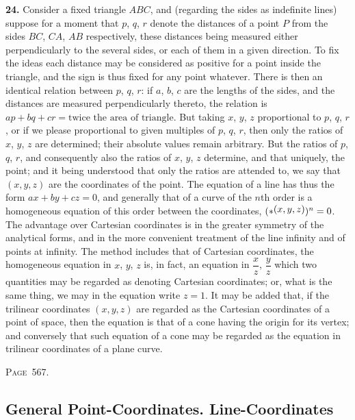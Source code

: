 \documentclass[11pt,a4paper]{article}
\theoremstyle{definition}
\begin{document}
\textbf{24.} Consider a fixed triangle $ABC$, and (regarding the sides as indefinite lines) suppose for a moment that $p$, $q$, $r$ denote the distances of a point $P$ from the sides $BC$, $CA$, $AB$ respectively, these distances being measured either perpendicularly to the several sides, or each of them in a given direction. To fix the ideas each distance may be considered as positive for a point inside the triangle, and the sign is thus fixed for any point whatever. There is then an identical relation between $p$, $q$, $r$: if $a$, $b$, $c$ are the lengths of the sides, and the distances are measured perpendicularly thereto, the relation is $ap+bq+cr=\text{twice the area of triangle}$. But taking $x$, $y$, $z$ proportional to $p$, $q$, $r$, or if we please proportional to given multiples of $p$, $q$, $r$, then only the ratios of $x$, $y$, $z$ are determined; their absolute values remain arbitrary. But the ratios of $p$, $q$, $r$, and consequently also the ratios of $x$, $y$, $z$ determine, and that uniquely, the point; and it being understood that only the ratios are attended to, we say that $(x,y,z)$ are the coordinates of the point. The equation of a line has thus the form $ax+by+cz=0$, and generally that of a curve of the $n$th order is a homogeneous equation of this order between the coordinates, $(*\,\raisebox{0.5ex}{\text{$\!(x,y,z)$}})^n=0$. The advantage over Cartesian coordinates is in the greater symmetry of the analytical forms, and in the more convenient treatment of the line infinity and of points at infinity. The method includes that of Cartesian coordinates, the homogeneous equation in $x$, $y$, $z$ is, in fact, an equation in $\dfrac{x}{z}$, $\dfrac{y}{z}$ which two quantities may be regarded as denoting Cartesian coordinates; or, what is the same thing, we may in the equation write $z=1$. It may be added that, if the trilinear coordinates $(x,y,z)$ are regarded as the Cartesian coordinates of a point of space, then the equation is that of a cone having the origin for its vertex; and conversely that such equation of a cone may be regarded as the equation in trilinear coordinates of a plane curve.

\newpage
\noindent\textsc{Page~567.} \subsection*{General Point-Coordinates. Line-Coordinates}
\end{document}

